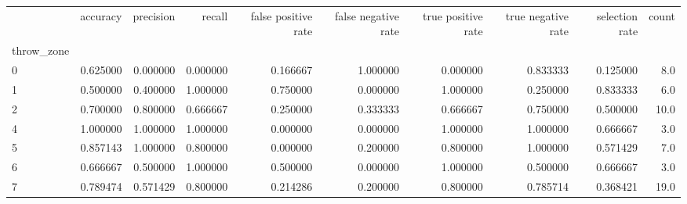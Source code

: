 \begin{tabular}{lrrrrrrrrr}
\toprule
{} &  accuracy &  precision &    recall &  false positive rate &  false negative rate &  true positive rate &  true negative rate &  selection rate &  count \\
throw\_zone &           &            &           &                      &                      &                     &                     &                 &        \\
\midrule
0          &  0.625000 &   0.000000 &  0.000000 &             0.166667 &             1.000000 &            0.000000 &            0.833333 &        0.125000 &    8.0 \\
1          &  0.500000 &   0.400000 &  1.000000 &             0.750000 &             0.000000 &            1.000000 &            0.250000 &        0.833333 &    6.0 \\
2          &  0.700000 &   0.800000 &  0.666667 &             0.250000 &             0.333333 &            0.666667 &            0.750000 &        0.500000 &   10.0 \\
4          &  1.000000 &   1.000000 &  1.000000 &             0.000000 &             0.000000 &            1.000000 &            1.000000 &        0.666667 &    3.0 \\
5          &  0.857143 &   1.000000 &  0.800000 &             0.000000 &             0.200000 &            0.800000 &            1.000000 &        0.571429 &    7.0 \\
6          &  0.666667 &   0.500000 &  1.000000 &             0.500000 &             0.000000 &            1.000000 &            0.500000 &        0.666667 &    3.0 \\
7          &  0.789474 &   0.571429 &  0.800000 &             0.214286 &             0.200000 &            0.800000 &            0.785714 &        0.368421 &   19.0 \\
\bottomrule
\end{tabular}
